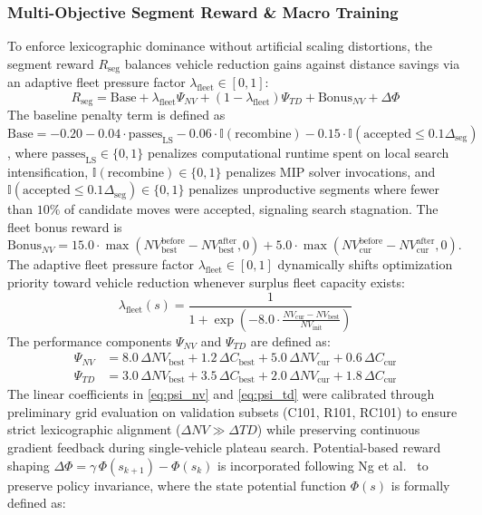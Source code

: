 \subsubsection{Multi-Objective Segment Reward \& Macro Training}
To enforce lexicographic dominance without artificial scaling distortions, the segment reward $R_{\text{seg}}$ balances vehicle reduction gains against distance savings via an adaptive fleet pressure factor $\lambda_{\text{fleet}} \in [0, 1]$:
\begin{equation}
  R_{\text{seg}} = \text{Base} + \lambda_{\text{fleet}} \Psi_{NV} + (1 - \lambda_{\text{fleet}}) \Psi_{TD} + \text{Bonus}_{NV} + \Delta \Phi
  \label{eq:segment_reward}
\end{equation}
The baseline penalty term is defined as $\text{Base} = -0.20 - 0.04 \cdot \text{passes}_{\text{LS}} - 0.06 \cdot \mathbb{I}(\text{recombine}) - 0.15 \cdot \mathbb{I}(\text{accepted} \le 0.1 \Delta_{\text{seg}})$, where $\text{passes}_{\text{LS}} \in \{0, 1\}$ penalizes computational runtime spent on local search intensification, $\mathbb{I}(\text{recombine}) \in \{0, 1\}$ penalizes MIP solver invocations, and $\mathbb{I}(\text{accepted} \le 0.1 \Delta_{\text{seg}}) \in \{0, 1\}$ penalizes unproductive segments where fewer than $10\%$ of candidate moves were accepted, signaling search stagnation. The fleet bonus reward is $\text{Bonus}_{NV} = 15.0 \cdot \max(NV_{\text{best}}^{\text{before}} - NV_{\text{best}}^{\text{after}}, 0) + 5.0 \cdot \max(NV_{\text{cur}}^{\text{before}} - NV_{\text{cur}}^{\text{after}}, 0)$. The adaptive fleet pressure factor $\lambda_{\text{fleet}} \in [0, 1]$ dynamically shifts optimization priority toward vehicle reduction whenever surplus fleet capacity exists:
\begin{equation}
  \lambda_{\text{fleet}}(s) = \frac{1}{1 + \exp\left(-8.0 \cdot \frac{NV_{\text{cur}} - NV_{\text{best}}}{NV_{\text{init}}}\right)}
  \label{eq:lambda_fleet}
\end{equation}
The performance components $\Psi_{NV}$ and $\Psi_{TD}$ are defined as:
\begin{align}
  \Psi_{NV} &= 8.0\,\Delta NV_{\text{best}} + 1.2\,\Delta C_{\text{best}} + 5.0\,\Delta NV_{\text{cur}} + 0.6\,\Delta C_{\text{cur}} \label{eq:psi_nv} \\
  \Psi_{TD} &= 3.0\,\Delta NV_{\text{best}} + 3.5\,\Delta C_{\text{best}} + 2.0\,\Delta NV_{\text{cur}} + 1.8\,\Delta C_{\text{cur}} \label{eq:psi_td}
\end{align}
The linear coefficients in \eqref{eq:psi_nv} and \eqref{eq:psi_td} were calibrated through preliminary grid evaluation on validation subsets (C101, R101, RC101) to ensure strict lexicographic alignment ($\Delta NV \gg \Delta TD$) while preserving continuous gradient feedback during single-vehicle plateau search. Potential-based reward shaping $\Delta \Phi = \gamma\,\Phi(s_{k+1}) - \Phi(s_k)$ is incorporated following Ng et al.\ \cite{ng1999policy} to preserve policy invariance, where the state potential function $\Phi(s)$ is formally defined as:
